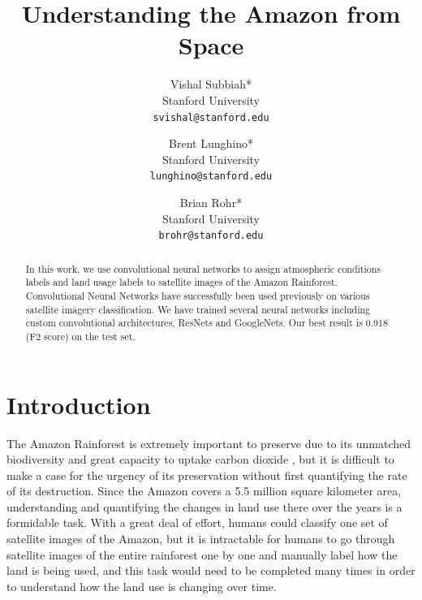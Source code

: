 \documentclass[10pt,twocolumn,letterpaper]{article}
\begin{document}
\title{Understanding the Amazon from Space}

\author{Vishal Subbiah*\\
Stanford University\\
{\tt\small svishal@stanford.edu}
\and
Brent Lunghino*\\
Stanford University\\
{\tt\small lunghino@stanford.edu}
\and
Brian Rohr*\\
Stanford University\\
{\tt\small brohr@stanford.edu}
}



\maketitle

\begin{abstract}
   In this work, we use convolutional neural networks to assign atmospheric conditions labels and land usage labels to satellite images of the Amazon Rainforest. Convolutional Neural Networks have successfully been used previously on various satellite imagery classification. We have trained several neural networks including custom convolutional architectures, ResNets and GoogleNets. Our best result is 0.918 (F2 score) on the test set.
\end{abstract}



\section{Introduction}

	The Amazon Rainforest is extremely important to preserve due to its unmatched biodiversity and great capacity to uptake carbon dioxide \cite{WWF}, but it is difficult to make a case for the urgency of its preservation without first quantifying the rate of its destruction.  Since the Amazon covers a 5.5 million square kilometer area, understanding and quantifying the changes in land use there over the years is a formidable task. With a great deal of effort, humans could classify one set of satellite images of the Amazon, but it is intractable for humans to go through satellite images of the entire rainforest one by one and manually label how the land is being used, and this task would need to be completed many times in order to understand how the land use is changing over time.
\end{document}
